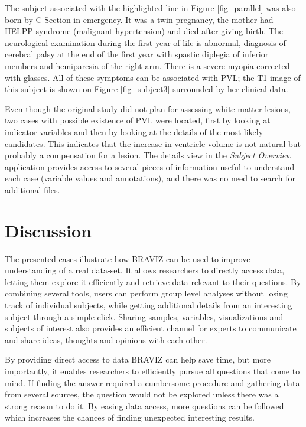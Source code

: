 \documentclass{frontiersHLTH}
\begin{document}
The subject associated with the highlighted line in Figure \ref{fig_parallel} was also born by C-Section in emergency. It was a twin pregnancy, the mother had HELPP syndrome (malignant hypertension) and died after giving birth. The neurological examination during the first year of life is abnormal, diagnosis of cerebral palsy at the end of the first year with spastic diplegia of inferior members and hemiparesia of the right arm.  There is a severe myopia corrected with glasses. All of these symptoms can be associated with PVL; the T1 image of this subject is shown on Figure \ref{fig_subject3} surrounded by her clinical data.

Even though the original study did not plan for assessing white matter lesions, two cases with possible existence of PVL were located, first by looking at indicator variables and then by looking at the details of the most likely candidates. This indicates that the increase in ventricle volume is not natural but probably a compensation for a lesion. The details view in the \emph{Subject Overview} application provides access to several pieces of information useful to  understand each case (variable values and annotations), and there was no need to search for additional files. 

\section{Discussion}
\label{sec:disc}

The presented cases illustrate how BRAVIZ can be used to improve understanding of a real data-set. 
It allows researchers to directly access data, letting them explore it efficiently and retrieve data relevant to their questions. By combining several tools, users can perform group level analyses without losing track of individual subjects, while getting additional details from an interesting subject through a simple click. Sharing samples, variables, visualizations and subjects of interest also provides an efficient channel for experts to communicate and share ideas, thoughts and opinions with each other.

By providing direct access to data BRAVIZ can help save time, but more importantly, it enables researchers to efficiently pursue all questions that come to mind. If finding the answer required a cumbersome procedure and gathering data from several sources, the question would not be explored unless there was a strong reason to do it. By easing data access, more questions can be followed which increases the chances of finding unexpected interesting results.
\end{document}
